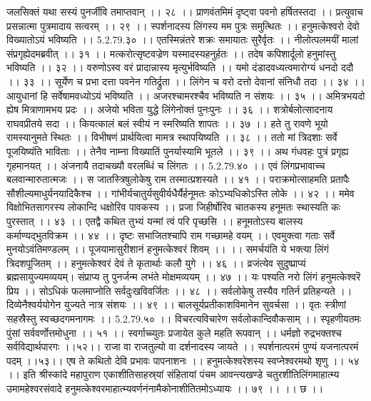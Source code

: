 जलसिक्तं यथा सस्यं पुनर्जीवि तमाप्तवान् ।। २८ ।।
प्राणवंतमिमं दृष्ट्वा पवनो हर्षितस्तदा ।।
प्रत्युवाच प्रसन्नात्मा पुत्रमादाय सत्वरम् ।। २९ ।।
स्पर्शनादस्य लिंगस्य मम पुत्रः समुत्थितः ।।
हनुमत्केश्वरो देवो विख्यातोऽयं भविष्यति ।। 5.2.79.३० ।।
एतस्मिन्नंतरे शक्रः समायातः सुरैर्वृतः ।।
नीलोत्पलमयीं मालां संप्रगृह्येदमब्रवीत् ।। ३१ ।।
मत्करोत्सृष्टवज्रेण यस्मादस्यहनुर्हतः ।।
तदेष कपिशार्दूलो हनुमांस्तु भविष्यति ।। ३२ ।।
वरुणोऽस्व वरं प्रादान्नास्य मृत्युर्भविष्यति ।।
यमो दंडादवध्यत्वमारोग्यं धनदो ददौ ।। ३३ ।।
सूर्येण च प्रभा दत्ता पवनेन गतिर्द्रुता ।।
लिंगेन च वरो दत्तो देवानां संनिधौ तदा ।। ३४ ।।
आयुधानां हि सर्वेषामवध्योऽयं भविष्यति ।।
अजरश्चामरश्चैव भविष्यति न संशयः ।। ३५ ।।
अमित्रभयदो ह्येष मित्राणामभय प्रदः ।।
अजेयो भविता युद्धे लिंगेनोक्तं पुनःपुनः ।। ३६ ।।
शत्रोर्बलोत्सादनाय राघवप्रीतये सदा ।।
कियत्कालं बलं स्वीयं न स्मरिष्यति शापतः ।। ३७ ।।
हते तु रावणे भूयो रामस्यानुमते स्थितः ।।
विभीषणं प्रार्थयित्वा मामत्र स्थापयिष्यति ।। ३८ ।।
ततो मां त्रिदशाः सर्वे पूजयिष्यंति भाविताः ।।
तेनैव नाम्ना विख्यातिं पुनर्यास्यामि भूतले ।। ३९ ।।
अथ गंधवहः पुत्रं प्रगृह्य गृहमानयत् ।।
अंजनायै तदाचख्यौ वरलब्धिं च लिंगतः ।। 5.2.79.४० ।।
एवं लिंगप्रभावाच्च बलवान्मारुतात्मजः ।।
स जातस्त्रिषुलोकेषु राम तस्मात्प्रशस्यते ।। ४१ ।।
पराक्रमोत्साहमति प्रतापैः सौशील्यमाधुर्यनयादिकैश्च ।।
गांभीर्यचातुर्यसुवीर्यधैर्यैर्हनूमतः कोऽभ्यधिकोऽस्ति लोके ।। ४२ ।।
ममेव विक्षोभितसागरस्य लोकान्दि धक्षोरिव पावकस्य ।।
प्रजा जिहीर्षोरिव चातकस्य हनूमतः स्थास्यति कः पुरस्तात् ।। ४३ ।।
एतद्वै कथित तुभ्यं यन्मां त्वं परि पृच्छसि ।।
हनूमतोऽस्य बालस्य कर्माण्यद्भुतविक्रम ।। ४४ ।।
दृष्टः सभाजितश्चापि राम गच्छामहे वयम् ।।
एवमुक्त्वा गताः सर्वे मुनयोऽवंतिमण्डलम् ।।
पूजयामासुरीशानं हनुमत्केश्वरं शिवम् ।। ।।
समर्चयंति ये भक्त्या लिंगं त्रिदशपूजितम् ।।
हनुमत्केश्वरं देवं ते कृतार्थाः कलौ युगे ।। ४६ ।।
व्रजंत्येव सुदुष्प्राप्यं ब्रह्मसायुज्यमव्ययम्।
संप्राप्य तु पुनर्जन्म लभंते मोक्षमव्ययम् ।। ४७ ।।
यः पश्यति नरो लिंगं हनुमत्केश्वरॆ प्रिय ।।
सोऽधिकं फलमाप्नोति सर्वदुःखविवर्जितः ।। ४८ ।।
सर्वलोकेषु तस्यैव गतिर्न प्रतिहन्यते ।।
दिव्येनैश्वर्ययोगेन युज्यते नात्र संशयः ।। ४९ ।।
बालसूर्यप्रतीकाशविमानेन सुवर्चसा ।।
वृतः स्त्रीणां सहस्रैस्तु स्वच्छदगमनागमः ।। 5.2.79.५० ।।
विचरत्यविचारेण सर्वलोकान्दिवौकसाम् ।।
स्पृहणीयतमः पुंसां सर्ववर्णोत्तमोधुना ।। ५१ ।।
स्वर्गाच्च्युतः प्रजायेत कुले महति रूपवान् ।।
धर्मज्ञो रुद्रभक्तश्च सर्वविद्यार्थपारगः ।।५२।।
राजा वा राजतुल्यो वा दर्शनादस्य जायते ।।
स्पर्शनात्परमं पुण्यं यजनात्परमं पदम् ।।५३।।
एष ते कथितो देवि प्रभावः पापनाशनः ।।
हनुमत्केश्वरेशस्य स्वप्नेश्वरमथो शृणु ।। ५४ ।।
इति श्रीस्कांदे महापुराण एकाशीतिसाहस्र्यां संहितायां पंचम आवन्त्यखण्डे चतुरशीतिलिंगमाहात्म्य उमामहेश्वरसंवादे हनुमत्केश्वरमाहात्म्यवर्णनंनामैकोनाशीतितमोऽध्यायः ।। ७९ ।। ।। छ ।।


